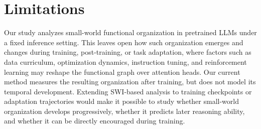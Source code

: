 \section{Limitations}
Our study analyzes small-world functional organization in pretrained LLMs under a fixed inference setting. This leaves open how such organization emerges and changes during training, post-training, or task adaptation, where factors such as data curriculum, optimization dynamics, instruction tuning, and reinforcement learning may reshape the functional graph over attention heads. Our current method measures the resulting organization after training, but does not model its temporal development. Extending SWI-based analysis to training checkpoints or adaptation trajectories would make it possible to study whether small-world organization develops progressively, whether it predicts later reasoning ability, and whether it can be directly encouraged during training.
